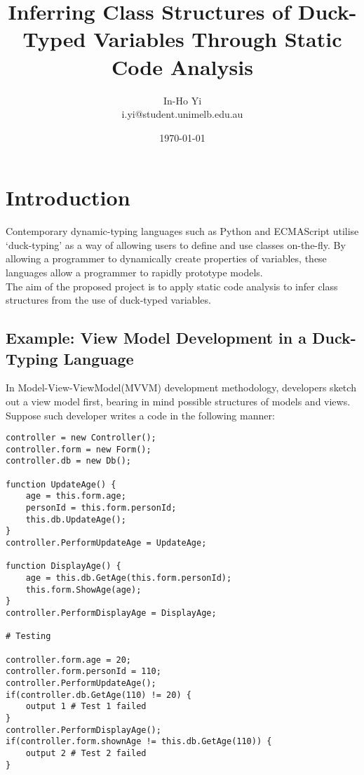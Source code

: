 \documentclass[a4paper,12pt]{article}
\begin{document}
\title{Inferring Class Structures of Duck-Typed Variables Through Static Code Analysis}
\author{In-Ho Yi\\
i.yi@student.unimelb.edu.au
}
\date{\today}
\maketitle
\section{Introduction}
Contemporary dynamic-typing languages such as Python and ECMAScript utilise `duck-typing' as a way of allowing users to define and use classes on-the-fly. By allowing a programmer to dynamically create properties of variables, these languages allow a programmer to rapidly prototype models.\\
The aim of the proposed project is to apply static code analysis to infer class structures from the use of duck-typed variables.\\

\subsection{Example: View Model Development in a Duck-Typing Language}
In Model-View-ViewModel(MVVM) development methodology, developers sketch out a view model first, bearing in mind possible structures of models and views. Suppose such developer writes a code in the following manner:\\
\begin{lstlisting}[caption=Controller written in a Duck-Typing language]
controller = new Controller();
controller.form = new Form();
controller.db = new Db();

function UpdateAge() {
	age = this.form.age;
	personId = this.form.personId;
	this.db.UpdateAge();
}
controller.PerformUpdateAge = UpdateAge;

function DisplayAge() {
	age = this.db.GetAge(this.form.personId);
	this.form.ShowAge(age);
}
controller.PerformDisplayAge = DisplayAge;

# Testing

controller.form.age = 20;
controller.form.personId = 110;
controller.PerformUpdateAge();
if(controller.db.GetAge(110) != 20) {
	output 1 # Test 1 failed
}
controller.PerformDisplayAge();
if(controller.form.shownAge != this.db.GetAge(110)) {
	output 2 # Test 2 failed
}
\end{lstlisting}
\end{document}
